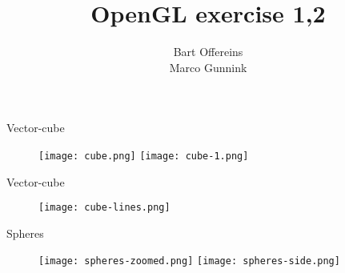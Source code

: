 \documentclass{beamer}
\author{Bart Offereins\\Marco Gunnink}
\title{OpenGL exercise 1,2}
\begin{document}
\titlepage

\begin{frame}{Vector-cube}

   \begin{figure}[ht]
       \texttt{[image: cube.png]} %
       \texttt{[image: cube-1.png]} %
    \end{figure}

\end{frame}

\begin{frame}{Vector-cube}

   \begin{figure}[ht]
       \texttt{[image: cube-lines.png]} %
    \end{figure}

\end{frame}

\begin{frame}{Spheres}

   \begin{figure}[ht]
       \texttt{[image: spheres-zoomed.png]} %
       \texttt{[image: spheres-side.png]} %
    \end{figure}

\end{frame}
\end{document}
